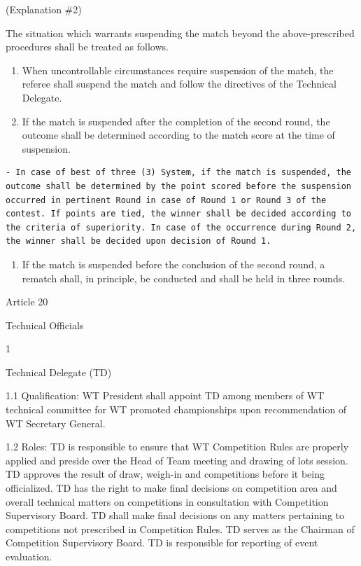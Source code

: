 \documentclass[
]{report}
\providecommand{\tightlist}{%
  \setlength{\itemsep}{0pt}\setlength{\parskip}{0pt}}
\renewcommand{\labelenumi}{\arabic{enumi}}
\begin{document}
(Explanation \#2)

The situation which warrants suspending the match beyond the
above-prescribed procedures shall be treated as follows.

\begin{enumerate}
\def\labelenumi{\roman{enumi}.}
\item
  When uncontrollable circumstances require suspension of the match, the
  referee shall suspend the match and follow the directives of the
  Technical Delegate.
\item
  If the match is suspended after the completion of the second round,
  the outcome shall be determined according to the match score at the
  time of suspension.
\end{enumerate}

\begin{verbatim}
- In case of best of three (3) System, if the match is suspended, the outcome shall be determined by the point scored before the suspension occurred in pertinent Round in case of Round 1 or Round 3 of the contest. If points are tied, the winner shall be decided according to the criteria of superiority. In case of the occurrence during Round 2, the winner shall be decided upon decision of Round 1.
\end{verbatim}

\begin{enumerate}
\def\labelenumi{\roman{enumi}.}
\setcounter{enumi}{2}
\tightlist
\item
  If the match is suspended before the conclusion of the second round, a
  rematch shall, in principle, be conducted and shall be held in three
  rounds.
\end{enumerate}

Article 20

Technical Officials

1

Technical Delegate (TD)

1.1 Qualification: WT President shall appoint TD among members of WT
technical committee for WT promoted championships upon recommendation of
WT Secretary General.

1.2 Roles: TD is responsible to ensure that WT Competition Rules are
properly applied and preside over the Head of Team meeting and drawing
of lots session. TD approves the result of draw, weigh-in and
competitions before it being officialized. TD has the right to make
final decisions on competition area and overall technical matters on
competitions in consultation with Competition Supervisory Board. TD
shall make final decisions on any matters pertaining to competitions not
prescribed in Competition Rules. TD serves as the Chairman of
Competition Supervisory Board. TD is responsible for reporting of event
evaluation.
\end{document}
